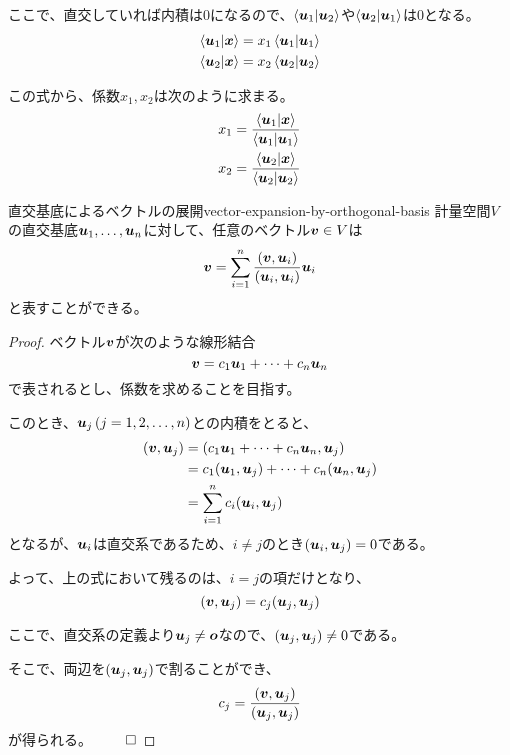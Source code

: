 \documentclass[../../../topic_linear-algebra]{subfiles}
\begin{document}
ここで、直交していれば内積は0になるので、$\braket{\vb*{u}_1|\vb*{u}_2}$や$\braket{\vb*{u}_2|\vb*{u}_1}$は0となる。
\begin{align*}
  \braket{\vb*{u}_1|\vb*{x}} & = x_1 \braket{\vb*{u}_1|\vb*{u}_1} \\
  \braket{\vb*{u}_2|\vb*{x}} & = x_2 \braket{\vb*{u}_2|\vb*{u}_2}
\end{align*}

この式から、係数$x_1, x_2$は次のように求まる。
\begin{align*}
  x_1 & = \frac{\braket{\vb*{u}_1|\vb*{x}}}{\braket{\vb*{u}_1|\vb*{u}_1}} \\
  x_2 & = \frac{\braket{\vb*{u}_2|\vb*{x}}}{\braket{\vb*{u}_2|\vb*{u}_2}}
\end{align*}

\begin{theorem}{直交基底によるベクトルの展開}{vector-expansion-by-orthogonal-basis}
  計量空間$V$の直交基底$\vb*{u}_1, \ldots, \vb*{u}_n$に対して、任意のベクトル$\vb*{v} \in V$は
  \begin{equation*}
    \vb*{v} = \sum_{i=1}^n \frac{(\vb*{v}, \vb*{u}_i)}{(\vb*{u}_i, \vb*{u}_i)} \vb*{u}_i
  \end{equation*}
  と表すことができる。
\end{theorem}

\begin{proof}
  ベクトル$\vb*{v}$が次のような線形結合
  \begin{equation*}
    \vb*{v} = c_1 \vb*{u}_1 + \cdots + c_n \vb*{u}_n
  \end{equation*}
  で表されるとし、係数を求めることを目指す。

  このとき、$\vb*{u}_j\, (j=1,2,\ldots,n)$との内積をとると、
  \begin{align*}
    (\vb*{v}, \vb*{u}_j) & = (c_1 \vb*{u}_1 + \cdots + c_n \vb*{u}_n, \vb*{u}_j)                           \\
                         & = c_1 (\vb*{u}_1, \vb*{u}_j) + \cdots + c_n (\vb*{u}_n, \vb*{u}_j) \\
                         & = \sum_{i=1}^n c_i (\vb*{u}_i, \vb*{u}_j)
  \end{align*}
  となるが、$\vb*{u}_i$は直交系であるため、$i \neq j$のとき$(\vb*{u}_i, \vb*{u}_j) = 0$である。

  よって、上の式において残るのは、$i=j$の項だけとなり、
  \begin{equation*}
    (\vb*{v}, \vb*{u}_j) = c_j (\vb*{u}_j, \vb*{u}_j)
  \end{equation*}

  ここで、直交系の定義より$\vb*{u}_j \neq \vb*{o}$なので、$(\vb*{u}_j, \vb*{u}_j) \neq 0$である。

  そこで、両辺を$(\vb*{u}_j, \vb*{u}_j)$で割ることができ、
  \begin{equation*}
    c_j = \frac{(\vb*{v}, \vb*{u}_j)}{(\vb*{u}_j, \vb*{u}_j)}
  \end{equation*}
  が得られる。 $\qed$
\end{proof}
\end{document}

